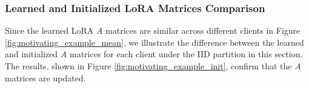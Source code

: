 

\subsubsection{Learned and Initialized LoRA Matrices Comparison}

Since the learned LoRA $A$ matrices are similar across different clients in Figure \ref{fig:motivating_example_mean}, 
we  illustrate the difference between the learned and initialized $A$ matrices for each client under the IID partition in this section. The results, shown in Figure \ref{fig:motivating_example_init}, confirm that the $A$ matrices are updated.

